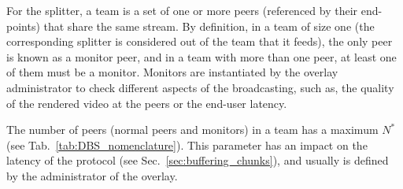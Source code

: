 

\label{sec:team_def}

For the splitter, a team is a set of one or more peers (referenced by
their end-points) that share the same stream. By definition, in a team
of size one (the corresponding splitter is considered out of the team
that it feeds), the only peer is known as a \gls{monitor} peer, and in
a team with more than one peer, at least one of them must be a
monitor. Monitors are instantiated by the overlay administrator to
check different aspects of the broadcasting, such as, the quality of
the rendered video at the peers or the end-user latency.

The number of peers (normal peers and monitors) in a team has a
maximum $N^*$ (see Tab.~\ref{tab:DBS_nomenclature}). This parameter
has an impact on the latency of the protocol (see
Sec.~\ref{sec:buffering_chunks}), and usually is defined by the
administrator of the overlay.

